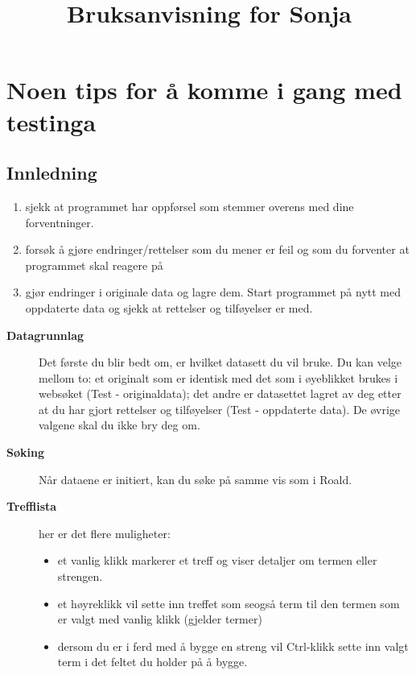 \documentclass[a4paper,norsk,11pt]{article}
\title{Bruksanvisning for Sonja}
\author{}\date{}
\begin{document}
\maketitle

\section{Noen tips for å komme i gang med testinga}

\subsection*{Innledning}
\begin{enumerate}
\item sjekk at programmet har oppførsel som stemmer overens med dine forventninger.
\item forsøk å gjøre endringer/rettelser som du mener er feil og som du forventer at programmet skal reagere på
 \item gjør endringer i originale data og lagre dem. Start programmet på nytt med oppdaterte data og sjekk at rettelser og tilføyelser er med.
\end{enumerate}

\begin{description}
 \item[\textbf{Datagrunnlag}] Det første du blir bedt om, er hvilket datasett du vil bruke. Du kan velge mellom to: et originalt som er identisk med det som i øyeblikket brukes i websøket (Test - originaldata); det andre er datasettet lagret av deg etter at du har gjort rettelser og tilføyelser (Test - oppdaterte data). De øvrige valgene skal du ikke bry deg om.
\item[\textbf{Søking}] Når dataene er initiert, kan du søke på samme vis som i Roald.
\item[\textbf{Trefflista}] her er det flere muligheter:
\begin{itemize}
 \item et vanlig klikk markerer et treff og viser detaljer om termen eller strengen.
\item et høyreklikk vil sette inn treffet som seogså term til den termen som er valgt med vanlig klikk (gjelder termer)
\item dersom du er i ferd med å bygge en streng vil Ctrl-klikk sette inn valgt term i det feltet du holder på å bygge.
\end{itemize}
\end{description}
\end{document}
